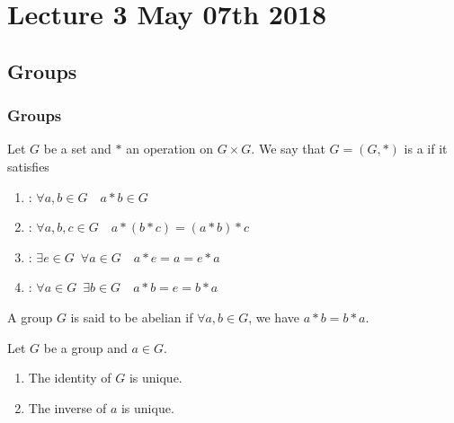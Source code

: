 \chapter{Lecture 3 May 07th 2018}
  \label{chapter:lecture_3_may_07th_2018}

\section{Groups} %
\label{sec:groups}

\subsection{Groups} %
\label{sub:groups}

\begin{defn}[Groups]\label{defn:groups}
  Let $G$ be a set and $*$ an operation on $G \times G$. We say that $G = (G, *)$ is a  if it satisfies
  \begin{enumerate}
    \item {}: $\forall a, b \in G \quad a * b \in G$
    \item {}: $\forall a, b, c \in G \quad a * (b * c) = (a * b) * c$
    \item {}: $\exists e \in G \enspace \forall a \in G \quad a * e = a = e * a$
    \item {}: $\forall a \in G \enspace \exists b \in G \quad a * b = e = b * a$
  \end{enumerate}
\end{defn}

\begin{defn}\label{defn:abelian_group}
  A group $G$ is said to be abelian if $\forall a, b \in G$, we have $a * b = b * a$.
\end{defn}

\begin{propo}\label{propo:uniqueness_of_group_identity_and_group_element_inverse}
  Let $G$ be a group and $a \in G$.
  \begin{enumerate}
    \item The identity of $G$ is unique.
    \item The inverse of $a$ is unique.
  \end{enumerate}
\end{propo}

